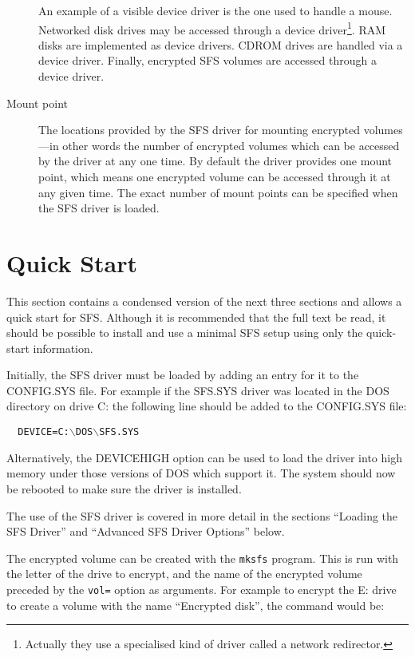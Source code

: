 \begin{description}
    An example of a visible device driver is the one used to handle a mouse.
    Networked disk drives may be accessed through a device driver\footnote{
		Actually they use a specialised kind of driver called a network
              	redirector.
    }.  RAM disks
    are implemented as device drivers.  CDROM drives are handled via a device
    driver.  Finally, encrypted SFS volumes are accessed through a device
    driver.

\item[Mount point]

    The locations provided by the SFS driver for mounting encrypted volumes---in
    other words the number of encrypted volumes which can be accessed by the
    driver at any one time.  By default the driver provides one mount point,
    which means one encrypted volume can be accessed through it at any given
    time.  The exact number of mount points can be specified when the SFS
    driver is loaded.

\end{description}

\section{Quick Start}

This section contains a condensed version of the next three sections and allows
a quick start for SFS.  Although it is recommended that the full text be read,
it should be possible to install and use a minimal SFS setup using only the
quick-start information.

Initially, the SFS driver must be loaded by adding an entry for it to the
CONFIG.SYS file.  For example if the SFS.SYS driver was located in the DOS
directory on drive C: the following line should be added to the CONFIG.SYS
file:

{\tt \verb|  |DEVICE=C:$\backslash$DOS$\backslash$SFS.SYS}

Alternatively, the DEVICEHIGH option can be used to load the driver into high
memory under those versions of DOS which support it.  The system should now be
rebooted to make sure the driver is installed.

The use of the SFS driver is covered in more detail in the sections ``Loading
the SFS Driver'' and ``Advanced SFS Driver Options'' below.

The encrypted volume can be created with the {\tt mksfs}
program.  This is run with the letter of the drive to encrypt, and the name of
the encrypted volume preceded by the {\tt vol=} option as arguments.  For 
example to encrypt the
E: drive to create a volume with the name ``Encrypted disk'', the command would
be:


